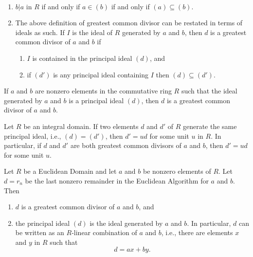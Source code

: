 \documentclass[../main]{subfiles}
\begin{document}
\begin{nt}
 ~\begin{enumerate}
   \item $b|a$ in $R$ if and only if $a \in (b)$ if and only if $(a) \subseteq (b)$.
   
   \item The above definition of greatest common divisor can be restated in terms of ideals as such. If $I$ is the ideal of $R$ generated by $a$ and $b$, then $d$ is a greatest common divisor  of $a$ and $b$ if
   \begin{enumerate}
    \item $I$ is contained in the principal ideal $(d)$, and
    
    \item if $(d')$ is any principal ideal containing $I$  then $(d) \subseteq (d')$.
   \end{enumerate}
  \end{enumerate}
\end{nt}


\begin{prop}
 If $a$ and $b$ are nonzero elements in the commutative ring $R$ such that the ideal generated by $a$ and $b$ is a principal ideal $(d)$, then $d$ is a greatest common divisor of $a$ and $b$.
\end{prop}


\begin{prop}
 Let $R$ be an integral domain. If two elements $d$ and $d'$ of $R$ generate the same principal ideal, i.e., $(d) = (d')$, then $d'=ud$ for some unit $u$ in $R$. In particular, if $d$ and $d'$ are both greatest common divisors of $a$ and $b$, then $d' = ud$ for some unit $u$.
\end{prop}


\begin{thm}
 Let $R$ be a Euclidean Domain and let $a$ and $b$ be nonzero elements of $R$. Let $d=r_n$ be the last nonzero remainder in the Euclidean Algorithm for $a$ and $b$. Then
 \begin{enumerate}
  \item $d$ is a greatest common divisor of $a$ and $b$, and 
  
  \item the principal ideal $(d)$ is the ideal generated by $a$ and $b$. In particular, $d$ can be written as an $R$-linear combination of $a$ and $b$, i.e., there are elements $x$ and $y$ in $R$ such that 
  \[ d = ax + by. \]
 \end{enumerate}
\end{thm}
\end{document}
